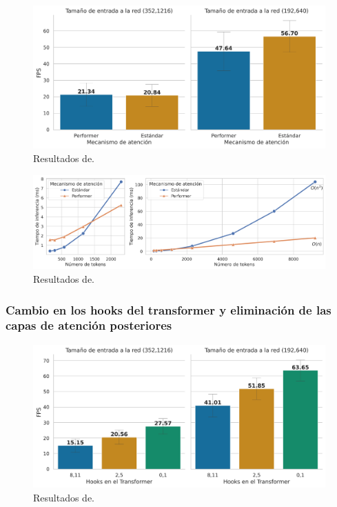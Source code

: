 \begin{figure}[H]
\centering
\includegraphics[width=0.9\linewidth]{imagenes/Resultados/velocidad_inferencia_mecanismo_atencion.png} 
\captionsetup{width=.8\linewidth}
\caption{Resultados de.}
\label{fig:resultados-inf-mec-atention}
\end{figure}

\begin{figure}[H]
\centering
\includegraphics[width=\linewidth]{imagenes/Resultados/complejidad_mecanismo_atencion.png} 
\captionsetup{width=.8\linewidth}
\caption{Resultados de.}
\label{fig:resultados-complejidad-mec-atencion}
\end{figure}

\subsubsection{Cambio en los hooks del transformer y eliminación de las capas de atención posteriores}

\begin{figure}[H]
\centering
\includegraphics[width=0.9\linewidth]{imagenes/Resultados/velocidad_inferencia_hooks.png} 
\captionsetup{width=.8\linewidth}
\caption{Resultados de.}
\label{fig:resultados-inf-hooks}
\end{figure}

